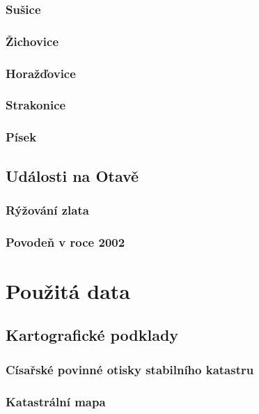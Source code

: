 \documentclass[thesis=M,czech]{FITthesis}[2012/06/26]
\begin{document}
\subsection{Sušice}


\subsection{Žichovice}

\subsection{Horažďovice}



\subsection{Strakonice}


\subsection{Písek}

\section{Události na Otavě}
\subsection{Rýžování zlata}

\subsection{Povodeň v roce 2002}

\chapter{Použitá data}
\section{Kartografické podklady}
\subsection{Císařské povinné otisky stabilního katastru}

\subsection{Katastrální mapa}
\end{document}
